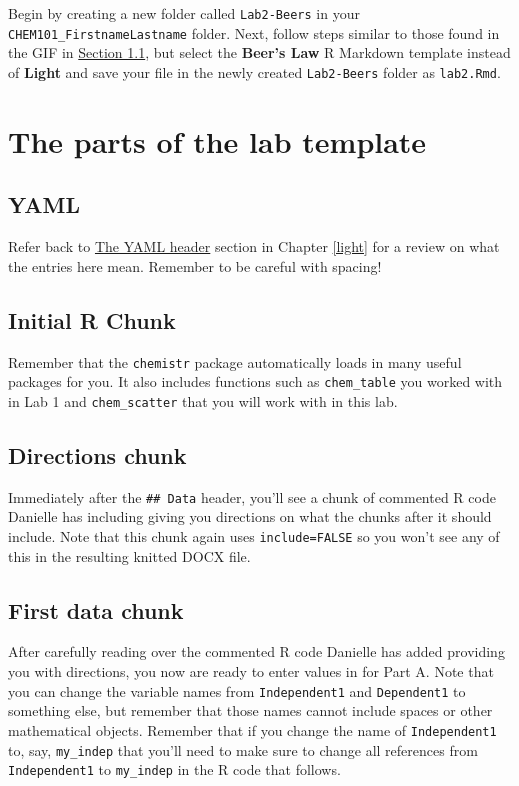 \documentclass[]{tufte-book}
\begin{document}
Begin by creating a new folder called \texttt{Lab2-Beers} in your
\texttt{CHEM101\_FirstnameLastname} folder. Next, follow steps similar
to those found in the GIF in
\protect\hyperlink{getting-the-lab-template}{Section 1.1}, but select
the \textbf{Beer's Law} R Markdown template instead of \textbf{Light}
and save your file in the newly created \texttt{Lab2-Beers} folder as
\texttt{lab2.Rmd}.

\section{The parts of the lab
template}\label{the-parts-of-the-lab-template-1}

\subsection{YAML}\label{yaml}

Refer back to \protect\hyperlink{the-yaml-header}{The YAML header}
section in Chapter \ref{light} for a review on what the entries here
mean. Remember to be careful with spacing!

\subsection{Initial R Chunk}\label{initial-r-chunk-1}

Remember that the \texttt{chemistr} package automatically loads in many
useful packages for you. It also includes functions such as
\texttt{chem\_table} you worked with in Lab 1 and \texttt{chem\_scatter}
that you will work with in this lab.

\subsection{Directions chunk}\label{directions-chunk}

Immediately after the \texttt{\#\#\ Data} header, you'll see a chunk of
commented R code Danielle has including giving you directions on what
the chunks after it should include. Note that this chunk again uses
\texttt{include=FALSE} so you won't see any of this in the resulting
knitted DOCX file.

\subsection{First data chunk}\label{first-data-chunk}

After carefully reading over the commented R code Danielle has added
providing you with directions, you now are ready to enter values in for
Part A. Note that you can change the variable names from
\texttt{Independent1} and \texttt{Dependent1} to something else, but
remember that those names cannot include spaces or other mathematical
objects. Remember that if you change the name of \texttt{Independent1}
to, say, \texttt{my\_indep} that you'll need to make sure to change all
references from \texttt{Independent1} to \texttt{my\_indep} in the R
code that follows.
\end{document}
